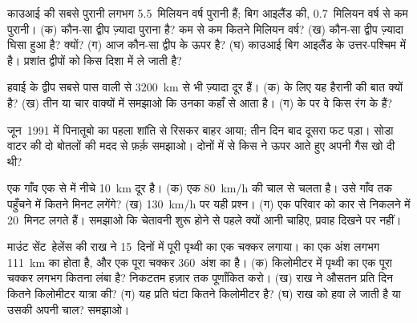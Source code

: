 \begin{exercise}[$\star\star$]\label{exo:g7:volcanoes:8}
काउआई की सबसे पुरानी  लगभग 5.5~मिलियन वर्ष पुरानी हैं; बिग आइलैंड की,
0.7~मिलियन वर्ष से कम पुरानी। (क) कौन-सा द्वीप ज़्यादा पुराना है? कम से कम
कितने मिलियन वर्ष? (ख) कौन-सा द्वीप ज़्यादा घिसा हुआ है? क्यों? (ग) आज कौन-सा
द्वीप  के ऊपर है? (घ) काउआई बिग आइलैंड के उत्तर-पश्चिम में है।
प्रशांत  द्वीपों को किस दिशा में ले जाती
है?
\end{exercise}

\begin{exercise}[$\star\star$]\label{exo:g7:volcanoes:9}
हवाई के द्वीप सबसे पास वाली  से \qty{3200}{km} से भी ज़्यादा दूर
हैं। (क)  के लिए यह हैरानी की बात क्यों है? (ख) तीन या चार वाक्यों
में समझाओ कि उनका  कहाँ से आता है। (ग)  के  पर वे
किस रंग के हैं?
\end{exercise}

\begin{exercise}[$\star\star$]\label{exo:g7:volcanoes:10}
जून~1991 में पिनातूबो का पहला  शांति से रिसकर बाहर आया; तीन दिन बाद
दूसरा  फट पड़ा। सोडा वाटर की दो बोतलों की मदद से फ़र्क़ समझाओ। दोनों में
से किस  ने ऊपर आते हुए अपनी गैस खो दी थी?
\end{exercise}

\begin{exercise}[$\star\star\star$]\label{exo:g7:volcanoes:11}
एक गाँव एक  से  में नीचे \qty{10}{km} दूर है। (क) एक
 \qty{80}{km/h} की चाल से चलता है। उसे गाँव तक पहुँचने
में कितने मिनट लगेंगे? (ख) \qty{130}{km/h} पर यही प्रश्न। (ग) एक परिवार को
कार से निकलने में 20~मिनट लगते हैं। समझाओ कि चेतावनी  शुरू होने से पहले
क्यों आनी चाहिए, प्रवाह दिखने पर नहीं।
\end{exercise}

\begin{exercise}[$\star\star\star$]\label{exo:g7:volcanoes:12}
माउंट सेंट~हेलेंस की राख ने 15~दिनों में पूरी पृथ्वी का एक चक्कर लगाया।
 का एक अंश लगभग \qty{111}{km} का होता है, और एक पूरा चक्कर 360~अंश का
है। (क) किलोमीटर में पृथ्वी का एक पूरा चक्कर लगभग कितना लंबा है? निकटतम हज़ार
तक पूर्णांकित करो। (ख) राख ने औसतन प्रति दिन कितने किलोमीटर यात्रा की? (ग) यह
प्रति घंटा कितने किलोमीटर है? (घ) राख को हवा ले जाती है या उसकी अपनी चाल?
समझाओ।
\end{exercise}


